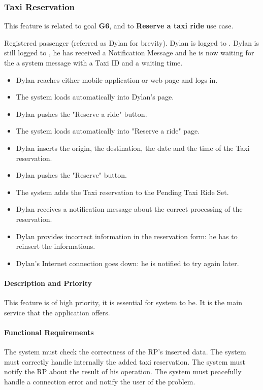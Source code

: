 \subsubsection{Taxi Reservation}
This feature is related to goal \textbf{G6}, and to \textbf{Reserve a taxi ride} use case.
\begin{itemize}
	 Registered passenger (referred as Dylan for brevity).
	 Dylan is logged to \myTaxiService{}.
	 Dylan is still logged to \myTaxiService{}, he has received a Notification Message and he is now waiting for the a system message with a Taxi ID and a waiting time.
	\begin{itemize}
		\item Dylan reaches either \myTaxiService{} mobile application or web page and logs in.
		\item The system loads automatically into Dylan's page.
		\item Dylan pushes the "Reserve a ride" button.
		\item The system loads automatically into "Reserve a ride" page.
		\item Dylan inserts the origin, the destination, the date and the time of the Taxi reservation.
		\item Dylan pushes the "Reserve" button.
		\item The system adds the Taxi reservation to the Pending Taxi Ride Set.
		\item Dylan receives a notification message about the correct processing of the reservation. 
	\end{itemize}
	\begin{itemize}
		\item Dylan provides incorrect information in the reservation form: he has to reinsert the informations.
		\item Dylan's Internet connection goes down: he is notified to try again later.  
	\end{itemize}
\end{itemize}
\paragraph{Description and Priority}
This feature is of high priority, it is essential for \myTaxiService{} system to be. It is the main service that the application offers.
\paragraph{Functional Requirements}
\begin{itemize}
	 The system must check the correctness of the RP's inserted data.
	 The system must correctly handle internally the added taxi reservation.
	 The system must notify the RP about the result of his operation.
	 The system must peacefully handle a connection error and notify the user of the problem.
\end{itemize}
